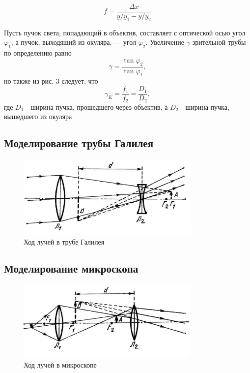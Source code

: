 \documentclass[a4paper,12pt]{article}
\theoremstyle{definition}
\begin{document}
\begin{equation}
    f = \frac{\Delta x}{y / y_1 - y / y_2}
\end{equation}

Пусть пучок света, попадающий в объектив, составляет с оптической осью угол $\varphi_1$, а пучок, выходящий из окуляра, — угол $\varphi_2$. Увеличение $\gamma$ зрительной трубы по определению равно
\begin{equation}
    \gamma = \frac{\tan \varphi_2}{\tan \varphi_1},
\end{equation}
но также из рис. 3 следует, что
\begin{equation}
    \gamma_K = \frac{f_1}{f_2} = \frac{D_1}{D_2},
\end{equation}
где $D_1$ - ширина пучка, прошедшего через объектив, а $D_2$ - ширина пучка, вышедшего из окуляра

\subsection{Моделирование трубы Галилея}

    \begin{figure}[H]
    \centering
    \includegraphics[width=9cm]{gal.PNG}
    \caption{Ход лучей в трубе Галилея}
    \label{fig:vac}
\end{figure}

\subsection{Моделирование микроскопа}

    \begin{figure}[h]
    \centering
    \includegraphics[width=9cm]{micro.PNG}
    \caption{Ход лучей в микроскопе}
    \label{fig:vac}
\end{figure}
\end{document}
